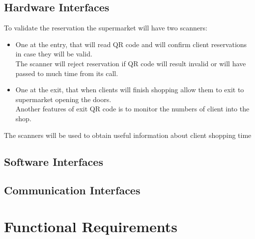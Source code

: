 \subsection{Hardware Interfaces}
To validate the reservation the supermarket will have two scanners:

\par \medskip 
\begin{itemize}
\item	One at the entry, that will read QR code and will confirm client reservations in case they will be valid. \\
The scanner will reject reservation if QR code will result invalid or will have passed to much time from its call.
\item One at the exit, that when clients will finish shopping allow them to exit to supermarket opening the doors. \\
Another features of exit QR code is to monitor the numbers of client into the shop.
\end{itemize} 
\par \medskip 
The scanners will be used to obtain useful information about client shopping time
\subsection{Software Interfaces}
\subsection{Communication Interfaces}
\section{Functional Requirements}


